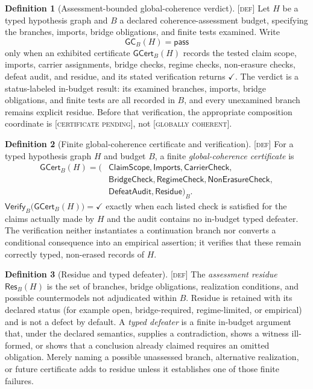 \documentclass[11pt]{article}
\newcommand{\GCpass}{\textsc{[globally coherent]}}
\newcommand{\GCpending}{\textsc{[certificate pending]}}
\newcommand{\GCcert}{\ensuremath{\mathsf{GCert}}}
\newcommand{\GCverify}{\ensuremath{\mathsf{Verify}}}
\newcommand{\Defn}{\textsc{[def]}}
\theoremstyle{definition}
\newtheorem{sdefinition}{Definition}
\begin{document}
\begin{sdefinition}[Assessment-bounded global-coherence verdict]
\label{def:assessment-budget}
\Defn{} Let $H$ be a typed hypothesis graph and $B$ a declared coherence-assessment
budget, specifying the branches, imports, bridge obligations, and finite tests
examined. Write
\begin{equation}
\mathsf{GC}_{B}(H)=\mathsf{pass}
\end{equation}
only when an exhibited certificate $\GCcert_B(H)$ records the tested claim scope,
imports, carrier assignments, bridge checks, regime checks, non-erasure checks,
defeat audit, and residue, and its stated verification returns \ensuremath{\checkmark}.
The verdict is a status-labeled in-budget result: its examined branches, imports,
bridge obligations, and finite tests are all recorded in $B$, and every unexamined
branch remains explicit residue. Before that verification, the appropriate
composition coordinate is \GCpending{}, not \GCpass{}.
\end{sdefinition}

\begin{sdefinition}[Finite global-coherence certificate and verification]
\label{def:global-coherence-certificate}
\Defn{} For a typed hypothesis graph $H$ and budget $B$, a finite
\emph{global-coherence certificate} is
\begin{equation}
\begin{aligned}
\GCcert_B(H)=\bigl(&\mathsf{ClaimScope},\mathsf{Imports},\mathsf{CarrierCheck},\\
&\mathsf{BridgeCheck},\mathsf{RegimeCheck},\mathsf{NonErasureCheck},\\
&\mathsf{DefeatAudit},\mathsf{Residue}\bigr)_B.
\end{aligned}
\label{eq:global-coherence-certificate}
\end{equation}
$\GCverify_B\bigl(\GCcert_B(H)\bigr)=\checkmark$ exactly when each listed
check is satisfied for the claims actually made by $H$ and the audit contains no
in-budget typed defeater. The verification neither instantiates a continuation
branch nor converts a conditional consequence into an empirical assertion; it
verifies that these remain correctly typed, non-erased records of $H$.
\end{sdefinition}

\begin{sdefinition}[Residue and typed defeater]
\label{def:residue-defeater}
\Defn{} The \emph{assessment residue} $\mathsf{Res}_{B}(H)$ is the set of
branches, bridge obligations, realization conditions, and possible countermodels
not adjudicated within $B$. Residue is retained with its declared status (for
example open, bridge-required, regime-limited, or empirical) and is not a defect
by default. A \emph{typed defeater} is a finite in-budget argument that, under the
declared semantics, supplies a contradiction, shows a witness ill-formed, or shows
that a conclusion already claimed requires an omitted obligation. Merely naming a
possible unassessed branch, alternative realization, or future certificate adds to
residue unless it establishes one of those finite failures.
\end{sdefinition}
\end{document}
